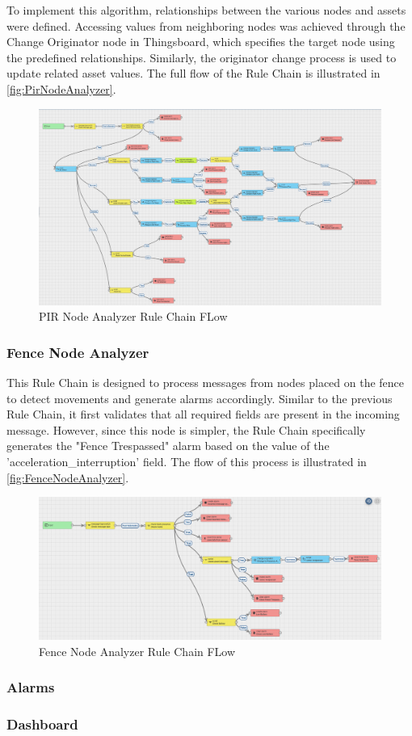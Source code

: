 To implement this algorithm, relationships between the various nodes and assets were defined. Accessing values from neighboring nodes was achieved through the Change
Originator node in Thingsboard, which specifies the target node using the predefined relationships. Similarly, the originator change process is used to update related 
asset values. The full flow of the Rule Chain is illustrated in \autoref{fig:PirNodeAnalyzer}.

\begin{figure}[H]
    \centering
    \includegraphics[width=1.4\textwidth,angle=90]{./images/8/PirNodeAnalyzer.PNG}
    \caption{PIR Node Analyzer Rule Chain FLow}
    \label{fig:PirNodeAnalyzer}
\end{figure}

\subsubsection*{Fence Node Analyzer}
This Rule Chain is designed to process messages from nodes placed on the fence to detect movements and generate alarms accordingly.  
Similar to the previous Rule Chain, it first validates that all required fields are present in the incoming message. However, since this node is simpler, the Rule 
Chain specifically generates the "Fence Trespassed" alarm based on the value of the 'acceleration\_interruption' field. The flow of this process is illustrated in \autoref{fig:FenceNodeAnalyzer}.

\begin{figure}[H]
    \centering
    \includegraphics[width=1\textwidth]{./images/8/FenceNodeAnalyzer.PNG}
    \caption{Fence Node Analyzer Rule Chain FLow}
    \label{fig:FenceNodeAnalyzer}
\end{figure}

\subsubsection*{Alarms}

\subsubsection*{Dashboard}